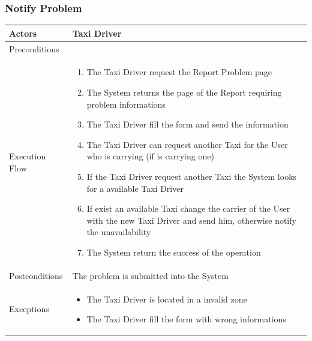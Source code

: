 \documentclass[english]{article}
\begin{document}
\subsubsection{Notify Problem}

\begin{tabular}{lp{8cm}}
\hline
Actors & Taxi Driver \\
\hline
Preconditions & \\
\hline
Execution Flow &  
		\begin{enumerate}
			\item The Taxi Driver request the Report Problem page
			\item The System returns the page of the Report requiring problem informations
			\item The Taxi Driver fill the form and send the information
			\item The Taxi Driver can request another Taxi for the User who is carrying (if is carrying one)
			\item If the Taxi Driver request another Taxi the System looks for a available Taxi Driver
			\item If exist an available Taxi change the carrier of the User with the new Taxi Driver and send him, otherwise notify the unavailability
			\item The System return the success of the operation
		\end{enumerate} 
	\\ 
\hline
Postconditions & The problem is submitted into the System \\
\hline
Exceptions & 
	\begin{itemize}
		\item The Taxi Driver is located in a invalid zone
		\item The Taxi Driver fill the form with wrong informations
	\end{itemize}
\end{tabular}
\end{document}
